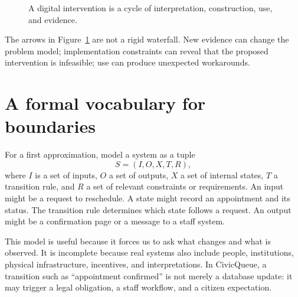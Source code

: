 \begin{figure}[H]
\centering
{}
\caption{A digital intervention is a cycle of interpretation, construction, use, and evidence.}
\label{fig:it-cycle}
\end{figure}

The arrows in Figure~\ref{fig:it-cycle} are not a rigid waterfall. New evidence can change the problem model; implementation constraints can reveal that the proposed intervention is infeasible; use can produce unexpected workarounds.

\section{A formal vocabulary for boundaries}
For a first approximation, model a system as a tuple
\[
S=(I,O,X,T,R),
\]
where $I$ is a set of inputs, $O$ a set of outputs, $X$ a set of internal states, $T$ a transition rule, and $R$ a set of relevant constraints or requirements. An input might be a request to reschedule. A state might record an appointment and its status. The transition rule determines which state follows a request. An output might be a confirmation page or a message to a staff system.

This model is useful because it forces us to ask what changes and what is observed. It is incomplete because real systems also include people, institutions, physical infrastructure, incentives, and interpretations. In CivicQueue, a transition such as ``appointment confirmed'' is not merely a database update: it may trigger a legal obligation, a staff workflow, and a citizen expectation.

